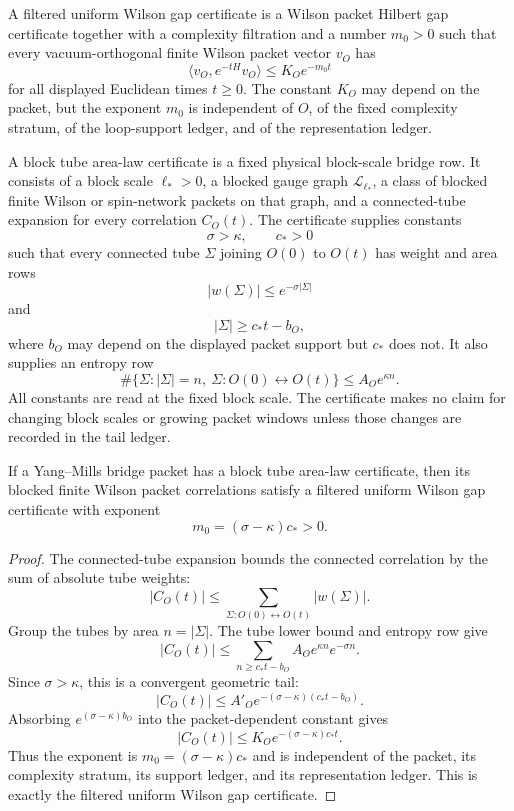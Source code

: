 \begin{definition}
\label{def:philosophy-filtered-uniform-wilson-gap-certificate}
A filtered uniform Wilson gap certificate is a Wilson packet Hilbert gap
certificate together with a complexity filtration and a number $m_0>0$ such
that every vacuum-orthogonal finite Wilson packet vector $v_O$ has
$$
\langle v_O,e^{-tH}v_O\rangle\le K_Oe^{-m_0t}
$$
for all displayed Euclidean times $t\ge0$. The constant $K_O$ may depend on
the packet, but the exponent $m_0$ is independent of $O$, of the fixed
complexity stratum, of the loop-support ledger, and of the representation
ledger.
\end{definition}

\begin{definition}
\label{def:philosophy-block-tube-area-law-certificate}
A block tube area-law certificate is a fixed physical block-scale bridge row.
It consists of a block scale $\ell_{\ast}>0$, a blocked gauge graph
$\mathcal L_{\ell_{\ast}}$, a class of blocked finite Wilson or spin-network
packets on that graph, and a connected-tube expansion for every correlation
$C_O(t)$. The certificate supplies constants
$$
\sigma>\kappa,\qquad c_{\ast}>0
$$
such that every connected tube $\Sigma$ joining $O(0)$ to $O(t)$ has weight
and area rows
$$
|w(\Sigma)|\le e^{-\sigma|\Sigma|}
$$
and
$$
|\Sigma|\ge c_{\ast}t-b_O,
$$
where $b_O$ may depend on the displayed packet support but $c_{\ast}$ does
not. It also supplies an entropy row
$$
\#\{\Sigma:|\Sigma|=n,\ \Sigma:O(0)\leftrightarrow O(t)\}
\le A_Oe^{\kappa n}.
$$
All constants are read at the fixed block scale. The certificate makes no
claim for changing block scales or growing packet windows unless those
changes are recorded in the tail ledger.
\end{definition}

\begin{theorem}
\label{thm:philosophy-block-tube-area-law-gives-filtered-wilson-decay}
If a Yang--Mills bridge packet has a block tube area-law certificate, then
its blocked finite Wilson packet correlations satisfy a filtered uniform
Wilson gap certificate with exponent
$$
m_0=(\sigma-\kappa)c_{\ast}>0.
$$
\end{theorem}
\begin{proof}
The connected-tube expansion bounds the connected correlation by the sum of
absolute tube weights:
$$
|C_O(t)|
\le
\sum_{\Sigma:O(0)\leftrightarrow O(t)}|w(\Sigma)|.
$$
Group the tubes by area $n=|\Sigma|$. The tube lower bound and entropy row
give
$$
|C_O(t)|
\le
\sum_{n\ge c_{\ast}t-b_O}A_Oe^{\kappa n}e^{-\sigma n}.
$$
Since $\sigma>\kappa$, this is a convergent geometric tail:
$$
|C_O(t)|
\le
A'_Oe^{-(\sigma-\kappa)(c_{\ast}t-b_O)}.
$$
Absorbing $e^{(\sigma-\kappa)b_O}$ into the packet-dependent constant gives
$$
|C_O(t)|\le K_Oe^{-(\sigma-\kappa)c_{\ast}t}.
$$
Thus the exponent is $m_0=(\sigma-\kappa)c_{\ast}$ and is independent of the
packet, its complexity stratum, its support ledger, and its representation
ledger. This is exactly the filtered uniform Wilson gap certificate.
\end{proof}

